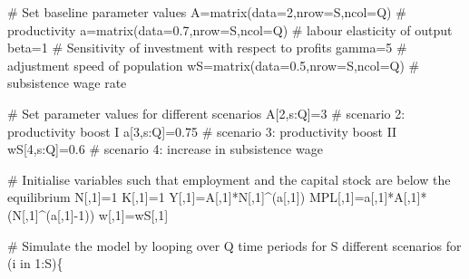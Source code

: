 \documentclass[
  letterpaper,
  DIV=11,
  numbers=noendperiod]{scrreprt}
\newenvironment{Shaded}{\begin{snugshade}}{\end{snugshade}}
\newcommand{\AttributeTok}[1]{\textcolor[rgb]{0.40,0.45,0.13}{#1}}
\newcommand{\CommentTok}[1]{\textcolor[rgb]{0.37,0.37,0.37}{#1}}
\newcommand{\ControlFlowTok}[1]{\textcolor[rgb]{0.00,0.23,0.31}{#1}}
\newcommand{\DecValTok}[1]{\textcolor[rgb]{0.68,0.00,0.00}{#1}}
\newcommand{\FloatTok}[1]{\textcolor[rgb]{0.68,0.00,0.00}{#1}}
\newcommand{\FunctionTok}[1]{\textcolor[rgb]{0.28,0.35,0.67}{#1}}
\newcommand{\NormalTok}[1]{\textcolor[rgb]{0.00,0.23,0.31}{#1}}
\newcommand{\OtherTok}[1]{\textcolor[rgb]{0.00,0.23,0.31}{#1}}
\newcommand{\SpecialCharTok}[1]{\textcolor[rgb]{0.37,0.37,0.37}{#1}}
\begin{document}
\begin{Shaded}
\begin{Highlighting}[]
\CommentTok{\# Set baseline parameter values}
\NormalTok{A}\OtherTok{=}\FunctionTok{matrix}\NormalTok{(}\AttributeTok{data=}\DecValTok{2}\NormalTok{,}\AttributeTok{nrow=}\NormalTok{S,}\AttributeTok{ncol=}\NormalTok{Q) }\CommentTok{\# productivity}
\NormalTok{a}\OtherTok{=}\FunctionTok{matrix}\NormalTok{(}\AttributeTok{data=}\FloatTok{0.7}\NormalTok{,}\AttributeTok{nrow=}\NormalTok{S,}\AttributeTok{ncol=}\NormalTok{Q) }\CommentTok{\# labour elasticity of output}
\NormalTok{beta}\OtherTok{=}\DecValTok{1} \CommentTok{\# Sensitivity of investment with respect to profits}
\NormalTok{gamma}\OtherTok{=}\DecValTok{5} \CommentTok{\# adjustment speed of population}
\NormalTok{wS}\OtherTok{=}\FunctionTok{matrix}\NormalTok{(}\AttributeTok{data=}\FloatTok{0.5}\NormalTok{,}\AttributeTok{nrow=}\NormalTok{S,}\AttributeTok{ncol=}\NormalTok{Q) }\CommentTok{\# subsistence wage rate}

\CommentTok{\# Set parameter values for different scenarios}
\NormalTok{A[}\DecValTok{2}\NormalTok{,s}\SpecialCharTok{:}\NormalTok{Q]}\OtherTok{=}\DecValTok{3} \CommentTok{\# scenario 2: productivity boost I}
\NormalTok{a[}\DecValTok{3}\NormalTok{,s}\SpecialCharTok{:}\NormalTok{Q]}\OtherTok{=}\FloatTok{0.75} \CommentTok{\# scenario 3: productivity boost II}
\NormalTok{wS[}\DecValTok{4}\NormalTok{,s}\SpecialCharTok{:}\NormalTok{Q]}\OtherTok{=}\FloatTok{0.6} \CommentTok{\# scenario 4: increase in subsistence wage}

\CommentTok{\# Initialise variables such that employment and the capital stock are below the equilibrium}
\NormalTok{N[,}\DecValTok{1}\NormalTok{]}\OtherTok{=}\DecValTok{1}
\NormalTok{K[,}\DecValTok{1}\NormalTok{]}\OtherTok{=}\DecValTok{1}   
\NormalTok{Y[,}\DecValTok{1}\NormalTok{]}\OtherTok{=}\NormalTok{A[,}\DecValTok{1}\NormalTok{]}\SpecialCharTok{*}\NormalTok{N[,}\DecValTok{1}\NormalTok{]}\SpecialCharTok{\^{}}\NormalTok{(a[,}\DecValTok{1}\NormalTok{])}
\NormalTok{MPL[,}\DecValTok{1}\NormalTok{]}\OtherTok{=}\NormalTok{a[,}\DecValTok{1}\NormalTok{]}\SpecialCharTok{*}\NormalTok{A[,}\DecValTok{1}\NormalTok{]}\SpecialCharTok{*}\NormalTok{(N[,}\DecValTok{1}\NormalTok{]}\SpecialCharTok{\^{}}\NormalTok{(a[,}\DecValTok{1}\NormalTok{]}\SpecialCharTok{{-}}\DecValTok{1}\NormalTok{))}
\NormalTok{w[,}\DecValTok{1}\NormalTok{]}\OtherTok{=}\NormalTok{wS[,}\DecValTok{1}\NormalTok{]}

\CommentTok{\# Simulate the model by looping over Q time periods for S different scenarios}
\ControlFlowTok{for}\NormalTok{ (i }\ControlFlowTok{in} \DecValTok{1}\SpecialCharTok{:}\NormalTok{S)\{}
  

\end{Highlighting}
\end{Shaded}
\end{document}
